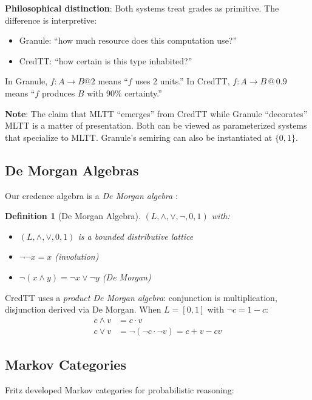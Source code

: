 \documentclass[11pt,a4paper]{article}
\makeatletter
\newtheorem{definition}{Definition}[section]
\newcommand{\at}[1]{\,@\,#1}
\newcommand{\negc}{\neg}
\makeatother
\begin{document}
\textbf{Philosophical distinction}: Both systems treat grades as primitive. The difference is interpretive:
\begin{itemize}
    \item Granule: ``how much resource does this computation use?''
    \item CredTT: ``how certain is this type inhabited?''
\end{itemize}

In Granule, $f : A \to B @ 2$ means ``$f$ uses 2 units.'' In CredTT, $f : A \to B \at{0.9}$ means ``$f$ produces $B$ with 90\% certainty.''

\textbf{Note}: The claim that MLTT ``emerges'' from CredTT while Granule ``decorates'' MLTT is a matter of presentation. Both can be viewed as parameterized systems that specialize to MLTT. Granule's semiring can also be instantiated at $\{0,1\}$.

\subsection{De Morgan Algebras}

Our credence algebra is a \emph{De Morgan algebra} \citep{kalman1958lattices}:

\begin{definition}[De Morgan Algebra]
$(L, \land, \lor, \neg, 0, 1)$ with:
\begin{itemize}
    \item $(L, \land, \lor, 0, 1)$ is a bounded distributive lattice
    \item $\neg\neg x = x$ (involution)
    \item $\neg(x \land y) = \neg x \lor \neg y$ (De Morgan)
\end{itemize}
\end{definition}

CredTT uses a \emph{product De Morgan algebra}: conjunction is multiplication, disjunction derived via De Morgan. When $L = [0,1]$ with $\neg c = 1-c$:
\begin{align}
c \land v &= c \cdot v \\
c \lor v &= \negc(\negc c \cdot \negc v) = c + v - cv
\end{align}

\subsection{Markov Categories}

Fritz \citep{fritz2020synthetic} developed Markov categories for probabilistic reasoning:
\end{document}
